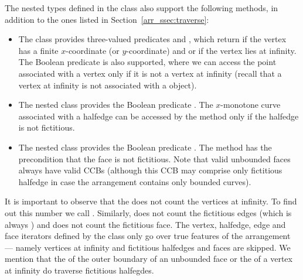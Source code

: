 The nested types defined in the  class also
support the following methods, in addition to the ones listed in
Section~\ref{arr_ssec:traverse}:
\begin{itemize}
\item
The  class provides three-valued predicates
 and , which
return  if the vertex has a finite $x$-coordinate (or
$y$-coordinate) and  or  if
the vertex lies at infinity. The Boolean predicate
 is also supported, where we can access the
point associated with a vertex only if it is not a vertex at infinity
(recall that a vertex at infinity is not associated with a
 object).
%
\item
The nested  class provides the Boolean predicate
. The $x$-monotone curve associated with
a halfedge can be accessed by the  method only if the
halfedge is not fictitious.
%
\item
The nested  class provides the Boolean predicate
. The method  has the
precondition that the face is not fictitious. Note that valid
unbounded faces always have valid CCBs (although this CCB may
comprise only fictitious halfedge in case the arrangement contains
only bounded curves).
\end{itemize}

It is important to observe that the 
does not count the vertices at infinity. To find out this number
we call . Similarly,
 does not count the fictitious edges
(which is always ) and
 does not count the fictitious face.
The vertex, halfedge, edge and face iterators defined by the
 class only go over true features of the
arrangement --- namely vertices at infinity and fictitious halfedges
and faces are skipped. We mention that the
 of the outer boundary of an unbounded
face or the  of a vertex at
infinity do traverse fictitious halfegdes.


